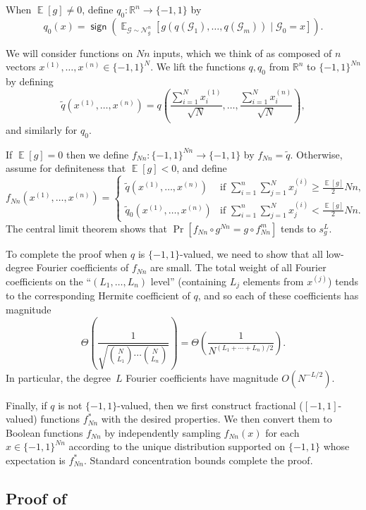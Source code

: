 \documentclass{article}
\theoremstyle{definition}
\theoremstyle{remark}
\DeclareMathOperator*{\E}{\mathbb{E}}
\providecommand{\cG}{\mathcal{G}}
\providecommand{\normal}{\mathcal{N}}
\providecommand{\normalg}[1]{\normal_{#1}}
\DeclareMathOperator{\sgn}{\mathsf{sign}}
\renewcommand\geq{\geqslant}
\begin{document}
When $\E[g] \neq 0$, define $q_0\colon \mathbb{R}^n \to \{-1,1\}$ by
\[
 q_0(x) = \sgn \left(\E_{\cG \sim \normalg{g}^n}[g(q(\cG_1),\ldots,q(\cG_m)) \mid \cG_0 = x]\right).
\]

We will consider functions on $Nn$ inputs, which we think of as composed of $n$ vectors $x^{(1)},\ldots,x^{(n)} \in \{-1,1\}^N$.
We lift the functions $q,q_0$ from $\mathbb{R}^n$ to $\{-1,1\}^{Nn}$ by defining
\[
 \tilde{q}(x^{(1)},\ldots,x^{(n)}) = q\left(\frac{\sum_{i=1}^N x^{(1)}_i}{\sqrt{N}}, \ldots, \frac{\sum_{i=1}^N x^{(n)}_i}{\sqrt{N}}\right),
\]
and similarly for $q_0$.

If $\E[g] = 0$ then we define $f_{Nn}\colon \{-1,1\}^{Nn} \to \{-1,1\}$ by $f_{Nn} = \tilde{q}$. Otherwise, assume for definiteness that $\E[g] < 0$, and define
\[
 f_{Nn}(x^{(1)},\ldots,x^{(n)}) =
 \begin{cases}
 \tilde{q}(x^{(1)},\ldots,x^{(n)}) & \text{if } \sum_{i=1}^n \sum_{j=1}^N x^{(i)}_j \geq \frac{\E[g]}{2} Nn, \\
 \tilde{q}_0(x^{(1)},\ldots,x^{(n)}) & \text{if } \sum_{i=1}^n \sum_{j=1}^N x^{(i)}_j < \frac{\E[g]}{2} Nn.
 \end{cases}
\]
The central limit theorem shows that $\Pr[f_{Nn} \circ g^{Nn} = g \circ f_{Nn}^m]$ tends to $s_g^L$.

To complete the proof when $q$ is $\{-1,1\}$-valued, we need to show that all low-degree Fourier coefficients of $f_{Nn}$ are small. The total weight of all Fourier coefficients on the ``$(L_1,\ldots,L_n)$ level'' (containing $L_j$ elements from $x^{(j)}$) tends to the corresponding Hermite coefficient of $q$, and so each of these coefficients has magnitude 
\[
 \Theta\left(\frac{1}{\sqrt{\binom{N}{L_1} \cdots \binom{N}{L_n}}}\right) = \Theta\left(\frac{1}{N^{(L_1 + \cdots + L_n)/2}}\right).
\]
In particular, the degree~$L$ Fourier coefficients have magnitude $O(N^{-L/2})$.

Finally, if $q$ is not $\{-1,1\}$-valued, then we first construct fractional ($[-1,1]$-valued) functions $f^*_{Nn}$ with the desired properties. We then convert them to Boolean functions $f_{Nn}$ by independently sampling $f_{Nn}(x)$ for each $x \in \{-1,1\}^{Nn}$ according to the unique distribution supported on $\{-1,1\}$ whose expectation is $f^*_{Nn}$. Standard concentration bounds complete the proof.

\subsection{Proof of }
\end{document}
